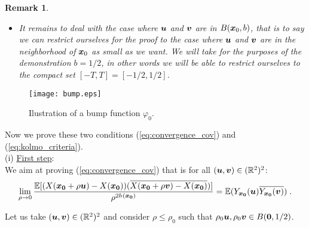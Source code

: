 \documentclass{elsarticle}
\newtheorem{remark}{Remark}
\begin{document}
\begin{remark}
\begin{itemize}
\begin{align*}
\end{align*}
with $\abs{\varphi_{\vect{x}_0}(\vect{x_0}+\rho_n \vect{u})-\varphi_{\vect{x}_0}(\vect{x_0}+\rho_n \vect{v})}^2\leq A(T)\rho_n^2 \norme{\vect{u}-\vect{v}}^2$ since $\varphi$ is $C^{\infty}$ that is a Lipschitz function and $ \mathbb{E}\left[X(\vect{x_0}+\rho_n \vect{u})^2\right]\leq B(T)$ by continuity of the covariance function, on the compact set $[-T,T]^2$. Again, \eqref{eq:kolmo_criteria_bis}  is satisfied.
\item It remains to deal with the case where $\bm{u}$ and $\bm{v}$ are in $B(\bm{x}_0,b)$, that is to say we can restrict ourselves for the proof to the case where $\bm{u}$ and $\bm{v}$ are in the neighborhood of $\bm{x}_0$ as small as we want. We will take for the purposes of the demonstration $b=1/2$, in other words we will be able to restrict ourselves to the compact set $[-T,T]=[-1/2,1/2]$.
\end{itemize}

\end{remark}

\begin{figure}
\centering
\texttt{[image: bump.eps]}
\caption{Ilustration of a bump function $\varphi_0$.}
\label{fig:bump}
\end{figure}


Now we prove these two conditions (\ref{eq:convergence_cov}) and (\ref{eq:kolmo_criteria}).\\

\noindent (i) \underline{First step}:  \\

We aim at proving (\ref{eq:convergence_cov}) that is for all $(\bm{u},\bm{v})\in (\mathbb{R}^2)^2$:
\begin{equation}\label{e:tangentfield}
\lim_{\rho\to 0}\frac{\mathbb{E}[(X(\bm{x_0}+\rho \bm{u})-X(\bm{x_0}))(\overline{X(\bm{x_0}+\rho \bm{v})-X(\bm{x_0})})]}{\rho^{2h(\bm{x_0})}}=\mathbb{E}(Y_{\bm{x_0}}(\bm{u})\overline{Y_{\bm{x_0}}(\bm{v})})\;.
\end{equation}

Let us take $(\bm{u},\bm{v})\in (\mathbb{R}^2)^2$ and consider $\rho\leq \rho_0$ such that $\rho_0\bm{u},\rho_0\bm{v}\in B(\bm{0},1/2)$.\\
\end{document}
